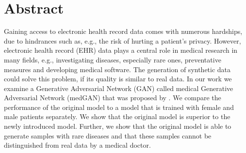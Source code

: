\documentclass[11pt, a4paper, oneside]{book}
\def\blankpage{%
      \clearpage%
      \thispagestyle{empty}%
      \addtocounter{page}{-1}%
      \null%
      \clearpage}
\begin{document}
\pagestyle{fancy}
\thispagestyle{empty}
\renewcommand{\bibname}{References}

\renewcommand\theadfont{\normalsize}

\thispagestyle{empty}
\maketitle

\blankpage

\thispagestyle{empty}
\section*{Abstract}
Gaining access to electronic health record data comes with numerous hardships, due to hindrances such as, e.g., the risk of hurting a patient's privacy. However, electronic health record (EHR) data plays a central role in medical research in many fields, e.g., investigating diseases, especially rare ones, preventative measures and developing medical software. The generation of synthetic data could solve this problem, if its quality is similar to real data. In our work we examine a Generative Adversarial Network (GAN) called medical Generative Adversarial Network (medGAN) that was proposed by \citep{Choi2017}. We compare the performance of the original model to a model that is trained with female and male patients separately. We show that the original model is superior to the newly introduced model. Further, we show that the original model is able to generate samples with rare diseases and that these samples cannot be distinguished from real data by a medical doctor.


\blankpage

\clearpage

\thispagestyle{empty}

\tableofcontents

\listoffigures %

\listoftables %

\clearpage

\blankpage


\end{document}
